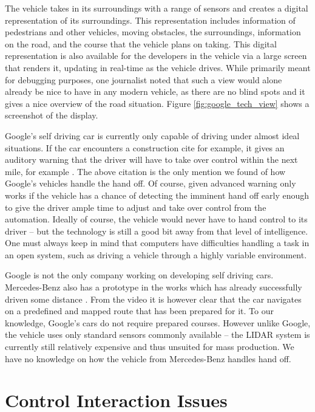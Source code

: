 \documentclass{acm_proc_article-sp}
\begin{document}
The vehicle takes in its surroundings with a range of sensors and creates a digital representation of its surroundings.
This representation includes information of pedestrians and other vehicles, moving obstacles, the surroundings, information on the road, and the course that the vehicle plans on taking.
This digital representation is also available for the developers in the vehicle via a large screen that renders it, updating in real-time as the vehicle drives.
While primarily meant for debugging purposes, one journalist noted that such a view would alone already be nice to have in any modern vehicle, as there are no blind spots and it gives a nice overview of the road situation.
Figure \ref{fig:google_tech_view} shows a screenshot of the display.

Google's self driving car is currently only capable of driving under almost ideal situations.
If the car encounters a construction cite for example, it gives an auditory warning that the driver will have to take over control within the next mile, for example \cite{www:newyorker_google_car}.
The above citation is the only mention we found of how Google's vehicles handle the hand off.
Of course, given advanced warning only works if the vehicle has a chance of detecting the imminent hand off early enough to give the driver ample time to adjust and take over control from the automation.
Ideally of course, the vehicle would never have to hand control to its driver – but the technology is still a good bit away from that level of intelligence.
One must always keep in mind that computers have difficulties handling a task in an open system, such as driving a vehicle through a highly variable environment.

Google is not the only company working on developing self driving cars.
Mercedes-Benz also has a prototype in the works which has already successfully driven some distance \cite{www:mercedes_autonomous}.
From the video it is however clear that the car navigates on a predefined and mapped route that has been prepared for it.
To our knowledge, Google's cars do not require prepared courses.
However unlike Google, the vehicle uses only standard sensors commonly available – the LIDAR system is currently still relatively expensive and thus unsuited for mass production.
We have no knowledge on how the vehicle from Mercedes-Benz handles hand off.

\section{Control Interaction Issues}
\end{document}

